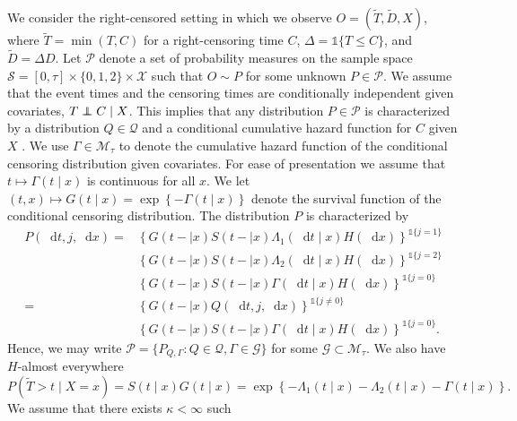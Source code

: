 \documentclass[alpha-refs]{wiley-article}
\newcommand\independent{\protect\mathpalette{\protect\independenT}{\perp}}
\def\independenT#1#2{\mathrel{\rlap{$#1#2$}\mkern2mu{#1#2}}}
\newcommand*\diff{\mathop{}\!\mathrm{d}}
\newcommand{\1}{\mathbb{1}} %
\newcommand{\sample}{\ensuremath{\mathcal{S}}}
\begin{document}
We consider the right-censored setting in which we observe \(O =
(\tilde{T},\tilde D, X)\), where $\tilde T = \min(T,C)$ for a
right-censoring time \(C\), $\Delta = \1{\{T \leq C\}}$, and \(\tilde
D=\Delta D\). Let \(\mathcal{P}\) denote a set of probability measures
on the sample space \(\sample = [0, \tau] \times \{0, 1, 2\}
\times \mathcal{X}\) such that \(O \sim P \) for some unknown \(P\in
\mathcal{P}\). We assume that the event times and the censoring times
are conditionally independent given covariates, \( T \independent C
\mid X \). This implies that any distribution \( P \in \mathcal{P} \)
is characterized by a distribution \( Q \in \mathcal{Q} \) and a
conditional cumulative hazard function for \( C \) given \( X \)
\citep[c.f.,][]{begun1983information,gill1997coarsening}. We use
\(\Gamma\in\mathcal{M}_{\tau}\) to denote the cumulative hazard
function of the conditional censoring distribution given
covariates. For ease of presentation we assume that \(t\mapsto
\Gamma(t \mid x) \) is continuous for all \( x \). We let
\((t,x)\mapsto G(t \mid x)=\exp\left\{-\Gamma(t \mid x)\right\}\)
denote the survival function of the conditional censoring
distribution. The distribution \( P \) is characterized by
\begin{equation}\label{eq:parametrizeP}
  \begin{split}
    P(\diff t, j, \diff x) =& \left\{G(t- \mid x)S(t- \mid x)\Lambda_1(\diff t \mid x)H(\diff x)\right\}^{\1{{\{j=1\}}}}\\
                            & \left\{G(t- \mid x)S(t- \mid x)\Lambda_2(\diff t \mid x)H(\diff x)\right\}^{\1{{\{j=2\}}}}\\
                            & \left\{G(t- \mid x)S(t- \mid x)\Gamma(\diff t \mid x)H(\diff x)\right\}^{\1{{\{j=0\}}}}\\
    = & \left\{G(t- \mid x)Q(\diff t,j,\diff x)\right\}^{\1{{\{j\ne 0\}}}}\\    
                            & \left\{G(t- \mid x)S(t- \mid x)\Gamma(\diff t \mid x)H(\diff x)\right\}^{\1{{\{j=0\}}}}.
  \end{split}
\end{equation}
Hence, we may write
\( \mathcal{P} = \{ P_{Q, \Gamma} : Q \in \mathcal{Q}, \Gamma \in
\mathcal{G} \} \) for some \( \mathcal{G} \subset \mathcal{M}_{\tau} \). We
also have \(H\)-almost everywhere
\begin{equation*}
P(\tilde T>t \mid X=x) = S(t \mid x)G(t \mid x) = \exp\left\{-\Lambda_{1}(t \mid x)-\Lambda_{2}(t \mid x)-\Gamma(t \mid x) \right\}.
\end{equation*} We assume that there exists \(\kappa<\infty\) such
\end{document}
